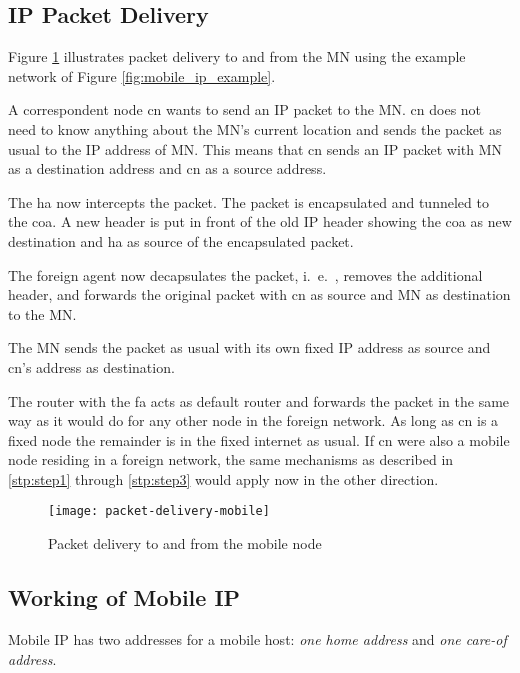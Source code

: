 \subsection{IP Packet Delivery}
Figure \ref{fig:packet_delivery_mobile} illustrates packet delivery to and from the MN using the example network of Figure \ref{fig:mobile_ip_example}. 
\begin{steps}
	\item A correspondent node \gls{cn} wants to send an IP packet to the MN. \gls{cn} does not need to know anything about the MN’s current location and sends the packet as usual to the IP address of MN. This means that \gls{cn} sends an IP packet with MN as a destination address and \gls{cn} as a source address. \label{stp:step1}
	\item The \gls{ha} now intercepts the packet. The packet is encapsulated and tunneled to the \gls{coa}. A new header is put in front of the old IP header showing the \gls{coa} as new destination and \gls{ha} as source of the encapsulated packet. \label{stp:step2}
	\item The foreign agent now decapsulates the packet, i.\ e.\ , removes the additional header, and forwards the original packet with \gls{cn} as source and MN as destination to the MN.\label{stp:step3}
	\item The MN sends the packet as usual with its own fixed IP address as source and \gls{cn}'s address as destination.\label{stp:step4}
\end{steps}

The router with the \gls{fa} acts as default router and forwards the packet in the same way as it would do for any other node in the foreign network. As long as \gls{cn} is a fixed node the remainder is in the fixed internet as usual. If \gls{cn} were also a mobile node residing in a foreign network, the same mechanisms as described in \ref{stp:step1} through \ref{stp:step3} would apply now in the other direction.
	
\begin{figure}[hpt]
	\centering
	\texttt{[image: packet-delivery-mobile]}
	\caption{Packet delivery to and from the mobile node}\label{fig:packet_delivery_mobile}
\end{figure}


\subsection*{Working of Mobile IP}
Mobile IP has two addresses for a mobile host: \textit{one home address} and \textit{one care-of address}. 

